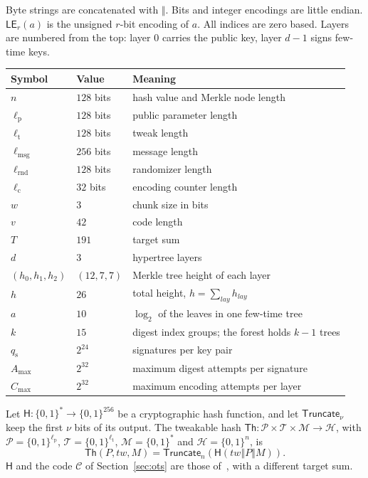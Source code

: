 \documentclass[11pt]{article}
\theoremstyle{definition}
\theoremstyle{plain}
\theoremstyle{remark}
\newcommand{\bits}[1]{\{0,1\}^{#1}}
\newcommand{\Th}{\mathsf{Th}}
\newcommand{\hash}{\mathsf{H}}
\newcommand{\LE}{\mathsf{LE}}
\newcommand{\Truncate}{\mathsf{Truncate}}
\newcommand{\concat}{\mathbin\Vert}
\newcommand{\tw}{\mathit{tw}}
\newcommand{\lmsg}{\ell_{\mathrm{msg}}}
\newcommand{\lpar}{\ell_{\mathrm{p}}}
\newcommand{\ltwk}{\ell_{\mathrm{t}}}
\newcommand{\lrnd}{\ell_{\mathrm{rnd}}}
\newcommand{\lctr}{\ell_{\mathrm{c}}}
\newcommand{\qs}{q_{\mathrm{s}}}
\newcommand{\amax}{A_{\max}}
\newcommand{\cmax}{C_{\max}}
\newcommand{\lay}{\mathit{lay}}
\begin{document}
Byte strings are concatenated with $\concat$. Bits and integer encodings are little endian. $\LE_r(a)$ is the unsigned $r$-bit encoding of $a$. All indices are zero based. Layers are numbered from the top: layer $0$ carries the public key, layer $d-1$ signs few-time keys.

\begin{center}
\begin{tabular}{@{}lll@{}}
\toprule
Symbol & Value & Meaning\\
\midrule
$n$ & $128$ bits & hash value and Merkle node length\\
$\lpar$ & $128$ bits & public parameter length\\
$\ltwk$ & $128$ bits & tweak length\\
$\lmsg$ & $256$ bits & message length\\
$\lrnd$ & $128$ bits & randomizer length\\
$\lctr$ & $32$ bits & encoding counter length\\
$w$ & $3$ & chunk size in bits\\
$v$ & $42$ & code length\\
$T$ & $191$ & target sum\\
$d$ & $3$ & hypertree layers\\
$(h_0,h_1,h_2)$ & $(12,7,7)$ & Merkle tree height of each layer\\
$h$ & $26$ & total height, $h=\sum_\lay h_\lay$\\
$a$ & $10$ & $\log_2$ of the leaves in one few-time tree\\
$k$ & $15$ & digest index groups; the forest holds $k-1$ trees\\
$\qs$ & $2^{24}$ & signatures per key pair\\
$\amax$ & $2^{32}$ & maximum digest attempts per signature\\
$\cmax$ & $2^{32}$ & maximum encoding attempts per layer\\
\bottomrule
\end{tabular}
\end{center}

Let $\hash:\bits{*}\to\bits{256}$ be a cryptographic hash function, and let $\Truncate_\nu$ keep the first $\nu$ bits of its output. The tweakable hash $\Th:\mathcal P\times\mathcal T\times\mathcal M\to\mathcal H$, with $\mathcal P=\bits{\lpar}$, $\mathcal T=\bits{\ltwk}$, $\mathcal M=\bits{*}$ and $\mathcal H=\bits{n}$, is
\[
  \Th(P,\tw,M)=\Truncate_n\!\left(\hash(\tw\concat P\concat M)\right).
\]
$\hash$ and the code $\mathcal C$ of Section~\ref{sec:ots} are those of~\cite{leanVM}, with a different target sum.
\end{document}
